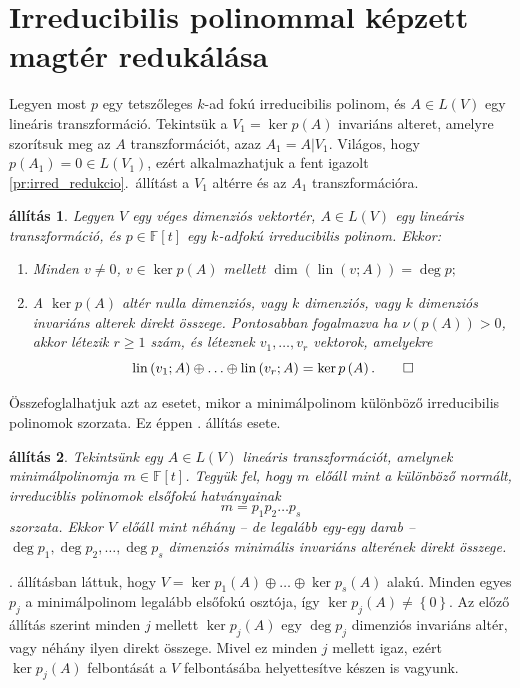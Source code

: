 \documentclass[a4paper, showtrims]{memoir}
\makeatletter
\renewenvironment{proof}[1][\proofname]
    {\par\pushQED{\qed}%
    \normalfont \topsep6\p@\@plus6\p@\relax
    \trivlist
    \item[\hskip\labelsep
        \itshape
    #1\@addpunct{:}]\ignorespaces}
    {\popQED\endtrivlist\@endpefalse}
\theoremstyle{plain}
\newtheorem{proposition}{állítás}[chapter]
\theoremstyle{remark}
\theoremstyle{definition}
\DeclareMathOperator{\lin}{lin}
\makeatother
\begin{document}
\section{Irreducibilis polinommal képzett magtér redukálása}
Legyen most $p$ egy tetszőleges $k$-ad fokú irreducibilis polinom,
és $A\in L(V)$ egy lineáris transzformáció.
Tekintsük a $V_1=\ker p\left( A \right)$ invariáns alteret, amelyre szorítsuk meg az $A$
transzformációt, azaz $A_1=A|V_1$.
Világos, hogy $p\left( A_1 \right)=0\in L\left( V_1 \right)$,
ezért alkalmazhatjuk a fent igazolt \ref{pr:irred_redukcio}.~állítást
a $V_1$ altérre és az $A_1$ transzformációra.
\begin{proposition}\label{pr:csaba}
	Legyen $V$ egy véges dimenziós vektortér, $A\in L\left( V \right)$ egy lineáris transzformáció,
	és $p\in\mathbb{F}\left[ t \right]$ egy $k$-adfokú irreducibilis polinom.
	Ekkor:
	\begin{enumerate}
		\item Minden $v\neq 0$, $v\in\ker p\left( A \right)$ mellett
		      \(
		      \dim\left( \lin(v;A) \right)=\deg p;
		      \)
		\item A $\ker p\left( A \right)$ altér nulla dimenziós,
		      vagy $k$ dimenziós, vagy $k$ dimenziós invariáns alterek direkt összege.
		      Pontosabban fogalmazva
		      ha $\nu\left(p(A) \right)>0$, akkor létezik $r\geq 1$ szám,
		      és léteznek $v_1,\ldots,v_r$ vektorok, amelyekre
		      \[
			      \lin\left( v_1;A \right)\oplus\ldots\oplus \lin\left( v_r;A \right)
			      =
			      \ker p\left( A \right).
			      \qedhere
		      \]
	\end{enumerate}
\end{proposition}
Összefoglalhatjuk azt az esetet,
mikor a minimálpolinom különböző irreducibilis polinomok szorzata.
Ez éppen . állítás esete.
\begin{proposition}\label{pr:minpolelsofokufelbontas}
	Tekintsünk egy $A\in L\left( V \right)$ lineáris transzformációt,
	amelynek minimálpolinomja $m\in\mathbb{F}\left[ t \right]$.
	Tegyük fel,
	hogy $m$ előáll mint a különböző normált, irreduciblis polinomok elsőfokú hatványainak
	\[
		m=p_1p_2\dots p_s
	\]
	szorzata.
	Ekkor $V$ előáll mint néhány -- de legalább egy-egy darab --
	$\deg p_1,\deg p_2,\ldots,\deg p_s$ dimenziós minimális invariáns alterének direkt összege.
\end{proposition}
\begin{proof}
    . állításban láttuk,
	hogy $V=\ker p_1\left( A \right)\oplus\ldots\oplus\ker p_s\left( A \right)$ alakú.
	Minden egyes $p_j$ a minimálpolinom legalább elsőfokú osztója, így $\ker p_j\left( A \right)\neq\left\{ 0 \right\}$.
	Az előző állítás szerint minden $j$ mellett $\ker p_j\left( A \right)$ egy $\deg p_j$
	dimenziós invariáns altér, vagy néhány ilyen direkt összege.
	Mivel ez minden $j$ mellett igaz, ezért $\ker p_j\left( A \right)$ felbontását a $V$ felbontásába helyettesítve készen is vagyunk.
\end{proof}
\end{document}
